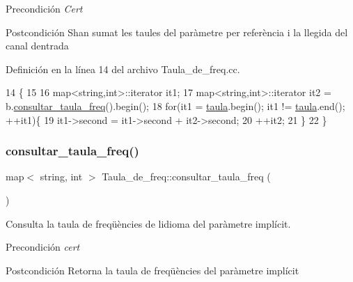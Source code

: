 \begin{DoxyPrecond}{Precondición}
{\itshape Cert} 
\end{DoxyPrecond}
\begin{DoxyPostcond}{Postcondición}
S\textquotesingle{}han sumat les taules del paràmetre per referència i la llegida del canal d\textquotesingle{}entrada 
\end{DoxyPostcond}


Definición en la línea 14 del archivo Taula\+\_\+de\+\_\+freq.\+cc.


\begin{DoxyCode}
14                                                  \{
15     
16     map<string,int>::iterator it1;
17     map<string,int>::iterator it2 = b.\hyperlink{class_taula__de__freq_a438f3ce025ca433420891fead5affae4}{consultar\_taula\_freq}().begin();
18     \textcolor{keywordflow}{for}(it1 = \hyperlink{class_taula__de__freq_a2c7db75db1ccbbe347de775844f3bbd7}{taula}.begin(); it1 != \hyperlink{class_taula__de__freq_a2c7db75db1ccbbe347de775844f3bbd7}{taula}.end(); ++it1)\{
19         it1->second = it1->second + it2->second;
20         ++it2;
21     \}
22 \}
\end{DoxyCode}
\mbox{\label{class_taula__de__freq_a438f3ce025ca433420891fead5affae4}} 
\subsubsection{\texorpdfstring{consultar\+\_\+taula\+\_\+freq()}{consultar\_taula\_freq()}}
{\footnotesize\ttfamily map$<$ string, int $>$ Taula\+\_\+de\+\_\+freq\+::consultar\+\_\+taula\+\_\+freq (\begin{DoxyParamCaption}{ }\end{DoxyParamCaption})}



Consulta la taula de freqüències de l\textquotesingle{}idioma del paràmetre implícit. 

\begin{DoxyPrecond}{Precondición}
{\itshape cert} 
\end{DoxyPrecond}
\begin{DoxyPostcond}{Postcondición}
Retorna la taula de freqüències del paràmetre implícit 
\end{DoxyPostcond}


